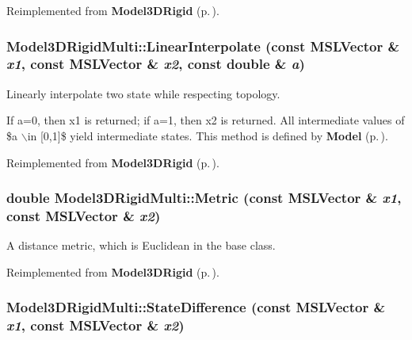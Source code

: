 Reimplemented from {\bf Model3DRigid} {\rm (p.\,\pageref{classModel3DRigid_a2})}.
\subsubsection{ Model3DRigid\-Multi::Linear\-Interpolate (const {\bf MSLVector} \& {\em x1}, const {\bf MSLVector} \& {\em x2}, const double \& {\em a})\hspace{0.3cm}{\tt  [virtual]}}\label{classModel3DRigidMulti_a4}


Linearly interpolate two state while respecting topology.

If a=0, then x1 is returned; if a=1, then x2 is returned. All intermediate values of \$a $\backslash$in [0,1]\$ yield intermediate states. This method is defined by {\bf Model} {\rm (p.\,\pageref{classModel})}. 

Reimplemented from {\bf Model3DRigid} {\rm (p.\,\pageref{classModel3DRigid_a5})}.
\subsubsection{\setlength{\rightskip}{0pt plus 5cm}double Model3DRigid\-Multi::Metric (const {\bf MSLVector} \& {\em x1}, const {\bf MSLVector} \& {\em x2})\hspace{0.3cm}{\tt  [virtual]}}\label{classModel3DRigidMulti_a2}


A distance metric, which is Euclidean in the base class.



Reimplemented from {\bf Model3DRigid} {\rm (p.\,\pageref{classModel3DRigid_a4})}.
\subsubsection{ Model3DRigid\-Multi::State\-Difference (const {\bf MSLVector} \& {\em x1}, const {\bf MSLVector} \& {\em x2})\hspace{0.3cm}{\tt  [virtual]}}\label{classModel3DRigidMulti_a5}


